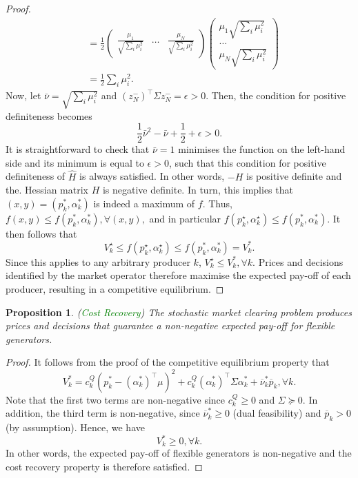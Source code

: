 \documentclass{article}
\newtheorem{proposition}{Proposition}
\begin{document}
\begin{proof}
\begin{align*}
&= \frac{1}{2} \begin{pmatrix} \frac{\mu_1}{\sqrt{\sum_i \mu_i^2}} & \ldots & \frac{\mu_N}{\sqrt{\sum_i \mu_i^2}}\end{pmatrix} \begin{pmatrix} \mu_1 \sqrt{\sum_i \mu_i^2} \\ \ldots \\ \mu_N \sqrt{\sum_i \mu_i^2} \end{pmatrix}\\
&= \frac{1}{2} \sum_i \mu_i^2.
\end{align*}
Now, let $\bar{\nu} = \sqrt{\sum_i \mu_i^2}$ and $(z_N^-)^\top \Sigma z_N^- = \epsilon > 0$. Then, the condition for positive definiteness becomes
\begin{equation*}
\frac{1}{2} \bar{\nu}^2 - \bar{\nu} + \frac{1}{2} + \epsilon > 0.
\end{equation*}
It is straightforward to check that $\bar{\nu} = 1$ minimises the function on the left-hand side and its minimum is equal to $\epsilon > 0$, such that this condition for positive definiteness of $\hat{H}$ is always satisfied. In other words, $-H$ is positive definite and the. Hessian matrix $H$ is negative definite. In turn, this implies that $(x, y) = (p_k^*, \alpha_k^*)$ is indeed a maximum of $f$. Thus, $f(x, y) \le f(p_k^*, \alpha_k^*), \forall (x, y),$ and in particular $ f(p_k^\star, \alpha_k^\star) \le f(p_k^*, \alpha_k^*)$. It then follows that
\begin{equation*}
V_k^\star \le f(p_k^\star, \alpha_k^\star) \le f(p_k^*, \alpha_k^*) = V_k^*.
\end{equation*}
Since this applies to any arbitrary producer $k$, $V_k^\star \le V_k^*, \forall k$. Prices and decisions identified by the market operator therefore maximise the expected pay-off of each producer, resulting in a competitive equilibrium.
\end{proof}

\begin{proposition}
(\textcolor{green}{Cost Recovery}) The stochastic market clearing problem produces prices and decisions that guarantee a non-negative expected pay-off for flexible generators.
\end{proposition}
\begin{proof}
It follows from the proof of the competitive equilibrium property that 
\begin{equation*}
V_k^*=  c_k^Q(p_k^* - (\alpha_k^*)^\top \mu)^2 + c_k^Q (\alpha_k^*)^\top \Sigma \alpha_k^* + \overline{\nu}_k^* \overline{p}_k, \forall k.
\end{equation*}
Note that the first two terms are non-negative since $c_k^Q \ge 0$ and $\Sigma \succeq 0$. In addition, the third term is non-negative, since $\overline{\nu}_k^* \ge 0$ (dual feasibility) and $\overline{p}_k > 0$ (by assumption). Hence, we have
\begin{equation*}
V_k^* \ge 0, \forall k.
\end{equation*}
In other words, the expected pay-off of flexible generators is non-negative and the cost recovery property is therefore satisfied.
\end{proof}
\end{document}
